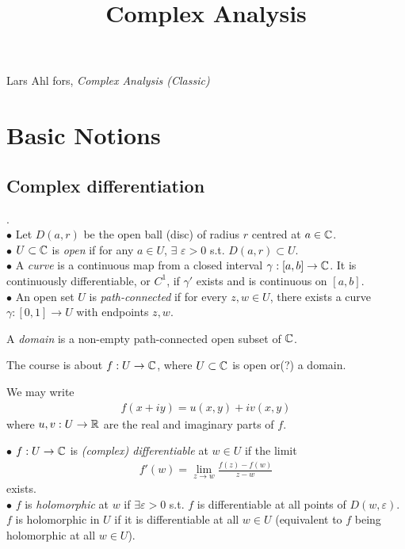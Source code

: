 \documentclass[a4paper]{article}
\begin{document}
\title{Complex Analysis}

\maketitle

\newpage

\tableofcontents

\newpage

Lars Ahl fors, \emph{Complex Analysis (Classic)}

\newpage

\section{Basic Notions}

\subsection{Complex differentiation}

\begin{notation}. \\
$\bullet$ Let $D(a,r)$ be the open ball (disc) of radius $r$ centred at $a \in \mathbb{C}$.\\
$\bullet$ $U \subset \mathbb{C}$ is \emph{open} if for any $a \in U$, $\exists$ $\varepsilon>0$ s.t. $D(a,r) \subset U$.\\
$\bullet$ A \emph{curve} is a continuous map from a closed interval $\gamma:[a,b] \to \mathbb{C}$. It is continuously differentiable, or $C^1$, if $\gamma'$ exists and is continuous on $[a,b]$.\\
$\bullet$ An open set $U$ is \emph{path-connected} if for every $z,w \in U$, there exists a curve $\gamma:[0,1] \to U$ with endpoints $z,w$.
\end{notation}

\begin{defi}
A \emph{domain} is a non-empty path-connected open subset of $\mathbb{C}$.
\end{defi}

The course is about $f:U \to \mathbb{C}$, where $U \subset \mathbb{C}$ is open or(?) a domain.

We may write
\begin{equation*}
\begin{aligned}
f(x+iy)=u(x,y)+iv(x,y)
\end{aligned}
\end{equation*}
where $u,v: U \to \mathbb{R}$ are the real and imaginary parts of $f$.

\begin{defi}
$\bullet$ $f:U \to \mathbb{C}$ is \emph{(complex) differentiable} at $w \in U$ if the limit
\begin{equation*}
\begin{aligned}
f'(w)=\lim_{z \to w} \frac{f(z)-f(w)}{z-w}
\end{aligned}
\end{equation*}
exists.\\
$\bullet$ $f$ is \emph{holomorphic} at $w$ if $\exists \varepsilon>0$ s.t. $f$ is differentiable at all points of $D(w,\varepsilon)$. $f$ is holomorphic in $U$ if it is differentiable at all $w \in U$ (equivalent to $f$ being holomorphic at all $w \in U$).
\end{defi}
\end{document}
